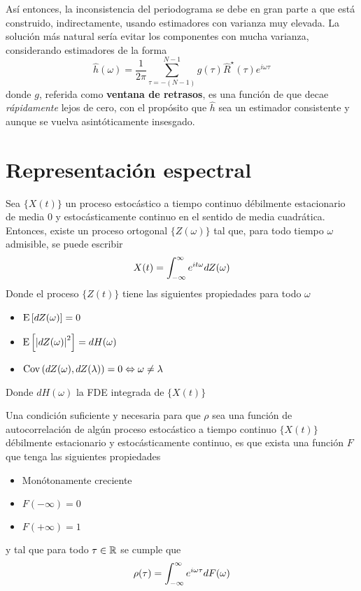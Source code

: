 Así entonces, la inconsistencia del periodograma se debe en gran parte a que está construido,
indirectamente, usando estimadores con varianza muy elevada.
La solución más natural sería evitar los componentes con mucha varianza, considerando estimadores de 
la forma
%
\begin{equation}
\widehat{h}(\omega) = \frac{1}{2 \pi} \sum_{\tau = -(N-1)}^{N-1} g(\tau) \widehat{R}^{\star}(\tau) 
e^{i \omega \tau} 
\label{txt_estimador}
\end{equation}
%
donde $g$, referida como \textbf{ventana de retrasos}, es una función de que decae 
\textit{rápidamente} lejos de cero, con el propósito que $\widehat{h}$ sea un estimador
consistente y aunque se vuelva asintóticamente insesgado.


\section{Representación espectral}

\begin{teorema}
Sea $\{X(t)\}$ un proceso estocástico a tiempo continuo débilmente estacionario de media 0 y 
estocásticamente continuo en el sentido de media cuadrática. Entonces, existe un proceso 
ortogonal $\{Z(\omega)\}$ tal que, para todo tiempo $\omega$ admisible, se puede 
escribir%
\begin{equation*}
X(t) = \int_{-\infty}^{\infty} e^{i t \omega} dZ(\omega)
\end{equation*}
Donde el proceso $\{Z(t)\}$ tiene las siguientes propiedades para todo $\omega$
\begin{itemize}
\item $\mathrm{E}\left[ dZ(\omega) \right] = 0$
\item $\mathrm{E}\left[ \left| dZ(\omega) \right|^{2} \right] = dH(\omega)$
\item $\mathrm{Cov}\left( dZ(\omega),dZ(\lambda) \right) = 0 \Leftrightarrow \omega \neq \lambda$
\end{itemize}
Donde $dH(\omega)$ la FDE integrada de $\{X(t)\}$
\end{teorema}

\begin{teorema}
Una condición suficiente y necesaria para que $\rho$ sea una función de autocorrelación de 
algún proceso estocástico a tiempo continuo $\{X(t)\}$ débilmente estacionario y 
estocásticamente continuo, es que exista una función $F$ que tenga las siguientes propiedades
\begin{itemize}
\item Monótonamente creciente
\item $F(-\infty) = 0$
\item $F(+\infty) = 1$
\end{itemize}
y tal que para todo $\tau \in \mathbb{R}$ se cumple que
\begin{equation*}
\rho(\tau) = \int_{-\infty}^{\infty} e^{i \omega \tau} dF(\omega)
\end{equation*}
\label{t_wienerkhinchin}
\end{teorema}

